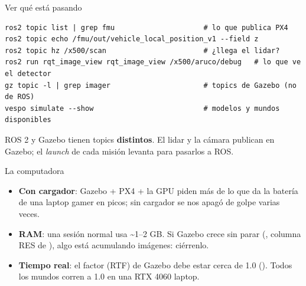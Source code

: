 \begin{frame}[fragile]{Ver qué está pasando}
  \begin{lstlisting}[style=bash,caption={Herramientas que conviene tener a la mano}]
ros2 topic list | grep fmu                     # lo que publica PX4
ros2 topic echo /fmu/out/vehicle_local_position_v1 --field z
ros2 topic hz /x500/scan                       # ¿llega el lidar?
ros2 run rqt_image_view rqt_image_view /x500/aruco/debug   # lo que ve el detector
gz topic -l | grep imager                      # topics de Gazebo (no de ROS)
vespo simulate --show                          # modelos y mundos disponibles
  \end{lstlisting}
  \begin{idea}
    \small ROS 2 y Gazebo tienen topics \textbf{distintos}. El lidar y la cámara publican en
    Gazebo; el \emph{launch} de cada misión levanta  para pasarlos a ROS.
  \end{idea}
\end{frame}

\begin{frame}{La computadora}
  \begin{itemize}
    \item \textbf{Con cargador}: Gazebo + PX4 + la GPU piden más de lo que da la batería
      de una laptop gamer en picos; sin cargador se nos apagó de golpe varias veces.
    \item \textbf{RAM}: una sesión normal usa \textasciitilde1--2 GB. Si Gazebo crece sin parar
      (, columna RES de ), algo está acumulando imágenes: ciérrenlo.
    \item \textbf{Tiempo real}: el factor (RTF) de Gazebo debe estar cerca de 1.0
      (). Todos los mundos corren a 1.0
      en una RTX 4060 laptop.
  \end{itemize}
\end{frame}
